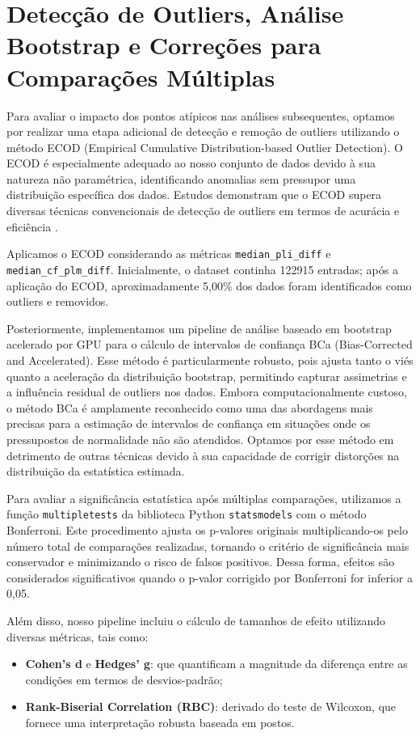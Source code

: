 \section{Detecção de Outliers, Análise Bootstrap e Correções para Comparações Múltiplas}

Para avaliar o impacto dos pontos atípicos nas análises subsequentes, optamos por realizar uma etapa adicional de detecção e remoção de outliers utilizando o método ECOD (Empirical Cumulative Distribution-based Outlier Detection). O ECOD é especialmente adequado ao nosso conjunto de dados devido à sua natureza não paramétrica, identificando anomalias sem pressupor uma distribuição específica dos dados. Estudos demonstram que o ECOD supera diversas técnicas convencionais de detecção de outliers em termos de acurácia e eficiência \cite{li2022ecod}.

Aplicamos o ECOD considerando as métricas \texttt{median\_pli\_diff} e \texttt{median\_cf\_plm\_diff}. Inicialmente, o dataset continha 122915 entradas; após a aplicação do ECOD, aproximadamente 5,00\% dos dados foram identificados como outliers e removidos.

Posteriormente, implementamos um pipeline de análise baseado em bootstrap acelerado por GPU para o cálculo de intervalos de confiança BCa (Bias-Corrected and Accelerated). Esse método é particularmente robusto, pois ajusta tanto o viés quanto a aceleração da distribuição bootstrap, permitindo capturar assimetrias e a influência residual de outliers nos dados. Embora computacionalmente custoso, o método BCa é amplamente reconhecido como uma das abordagens mais precisas para a estimação de intervalos de confiança em situações onde os pressupostos de normalidade não são atendidos. Optamos por esse método em detrimento de outras técnicas devido à sua capacidade de corrigir distorções na distribuição da estatística estimada.

Para avaliar a significância estatística após múltiplas comparações, utilizamos a função \texttt{multipletests} da biblioteca Python \texttt{statsmodels} com o método Bonferroni. Este procedimento ajusta os p-valores originais multiplicando-os pelo número total de comparações realizadas, tornando o critério de significância mais conservador e minimizando o risco de falsos positivos. Dessa forma, efeitos são considerados significativos quando o p-valor corrigido por Bonferroni for inferior a 0,05.

Além disso, nosso pipeline incluiu o cálculo de tamanhos de efeito utilizando diversas métricas, tais como:
\begin{itemize}
    \item \textbf{Cohen's d} e \textbf{Hedges' g}: que quantificam a magnitude da diferença entre as condições em termos de desvios-padrão;
    \item \textbf{Rank-Biserial Correlation (RBC)}: derivado do teste de Wilcoxon, que fornece uma interpretação robusta baseada em postos.
\end{itemize}

